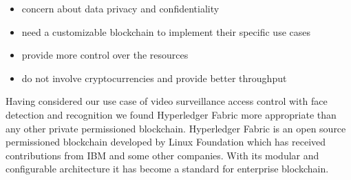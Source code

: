 \begin{itemize}
    \item concern about data privacy and confidentiality
    \item need a customizable blockchain to implement their specific use cases
    \item provide more control over the resources
    \item do not involve cryptocurrencies and provide better throughput  
\end{itemize}

Having considered our use case of video surveillance access control with face detection and recognition we found Hyperledger Fabric more appropriate than any other private permissioned blockchain. 
Hyperledger Fabric is an open source permissioned blockchain developed by Linux Foundation which has received contributions from IBM and some other companies. With its modular and configurable architecture it has become a standard for enterprise blockchain. 



